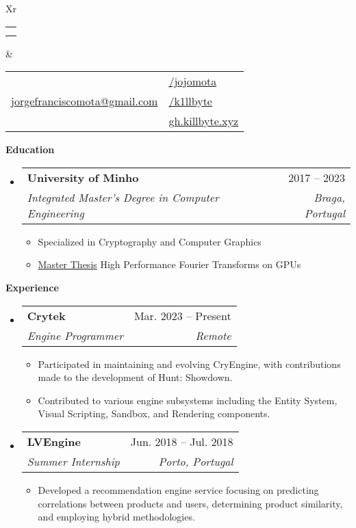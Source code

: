\documentclass[letterpaper,12pt]{article}[leftmargin=*]
\makeatletter
\def \fullname {Jorge Mota}
\def \subtitle {}
\def \linkedinicon {\faLinkedin}
\def \linkedinlink {https://linkedin.com/in/jojomota/}
\def \linkedintext {/jojomota}
\def \emailicon {\faEnvelope}
\def \emaillink {mailto:jorgefranciscomota@gmail.com}
\def \emailtext {jorgefranciscomota@gmail.com}
\def \githubicon {\faGithub}
\def \githublink {https://github.com/k1llbyte}
\def \githubtext {/k1llbyte}
\def \websiteicon {\faGlobe}
\def \websitelink {https://gh.killbyte.xyz/}
\def \websitetext {gh.killbyte.xyz}
\def \headertype {\doublecol} %
\def \entryspacing {-0pt}
\def \linkedin {\linkedinicon \hspace{3pt}\href{\linkedinlink}{\linkedintext}}
\def \phone {\phoneicon \hspace{3pt}{ \phonetext}}
\def \email {\emailicon \hspace{3pt}\href{\emaillink}{\emailtext}}
\def \github {\githubicon \hspace{3pt}\href{\githublink}{\githubtext}}
\def \website {\websiteicon \hspace{3pt}\href{\websitelink}{\websitetext}}
\renewcommand{\section}[2]{\vspace{5pt}
  \colorbox{secondary}{\color{white}\raggedbottom\normalsize\textbf{{#1}{\hspace{7pt}#2\hspace{7pt}}}}
}
\newcommand{\resumeEntryStart}{\begin{itemize}[leftmargin=2.5mm]}
\newcommand{\resumeEntryEnd}{\end{itemize}\vspace{\entryspacing}}
\newcommand{\resumeItemListStart}{\begin{itemize}[leftmargin=4.5mm]}
\newcommand{\resumeItemListEnd}{\end{itemize}}
\newcommand{\resumeItem}[1]{
  \item\small{
    {#1 \vspace{-2pt}}
  }
}
\newcommand{\resumeEntryTSDL}[4]{
  \vspace{-1pt}\item[]
    \begin{tabularx}{0.97\textwidth}{X@{\hspace{60pt}}r}
      \textbf{\color{primary}#1} & {\firabook\color{accent}\small#2} \\
      \textit{\color{accent}\small#3} & \textit{\color{accent}\small#4} \\
    \end{tabularx}\vspace{-6pt}
}
\newcommand{\doublecol}[6]{
  \begin{tabularx}{\textwidth}{Xr}
    {
      \begin{tabular}[c]{l}
        \fontsize{35}{45}\selectfont{\color{primary}{{\textbf{\fullname}}}} \\
        {\textit{\subtitle}} %
      \end{tabular}
    } & {
      \begin{tabular}[c]{l@{\hspace{1.5em}}l}
        {\small#4} & {\small#1} \\
        {\small#5} & {\small#2} \\
        {\small#6} & {\small#3}
      \end{tabular}
    }
  \end{tabularx}
}
\newcommand{\singlecol}[6]{
  \begin{tabularx}{\textwidth}{Xr}
    {
      \begin{tabular}[b]{l}
        \fontsize{35}{45}\selectfont{\color{primary}{{\textbf{\fullname}}}} \\
        {\textit{\subtitle}} %
      \end{tabular}
    } & {
      \begin{tabular}[c]{l}
        {\small#1} \\
        {\small#2} \\
        {\small#3} \\
        {\small#4} \\
        {\small#5} \\
        {\small#6}
      \end{tabular}
    }
  \end{tabularx}
}
\makeatother
\begin{document}


\headertype{\linkedin}{\github}{\website}{\phone}{\email}{} %
\vspace{-10pt} %

\section{}{Education}

  \resumeEntryStart
    \resumeEntryTSDL
      {University of Minho}{2017 -- 2023}
      {Integrated Master's Degree in Computer Engineering}{Braga, Portugal}
    \resumeItemListStart
      \resumeItem {Specialized in Cryptography and Computer Graphics}
      \resumeItem {\underline{Master Thesis} High Performance Fourier Transforms on GPUs}
    \resumeItemListEnd
  \resumeEntryEnd

\section{}{Experience}

  \resumeEntryStart
    \resumeEntryTSDL
      {Crytek}{Mar. 2023 -- Present}
      {Engine Programmer}{Remote}
    \resumeItemListStart
      \resumeItem {Participated in maintaining and evolving CryEngine, with contributions made to the development of Hunt: Showdown.}
      \resumeItem {Contributed to various engine subsystems including the Entity System, Visual Scripting, Sandbox, and Rendering components.}
    \resumeItemListEnd
  \resumeEntryEnd

  \resumeEntryStart
    \resumeEntryTSDL
      {LVEngine}{Jun. 2018 -- Jul. 2018}
      {Summer Internship}{Porto, Portugal}
    \resumeItemListStart
      \resumeItem {Developed a recommendation engine service focusing on predicting correlations between products and users, determining product similarity, and employing hybrid methodologies.}
    \resumeItemListEnd
  \resumeEntryEnd

\end{document}
